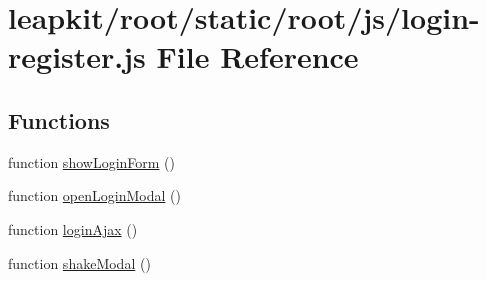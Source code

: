 \hypertarget{root_2static_2root_2js_2login-register_8js}{\section{leapkit/root/static/root/js/login-\/register.js File Reference}
\label{root_2static_2root_2js_2login-register_8js}
}
\subsection*{Functions}
\begin{DoxyCompactItemize}
\item 
function \hyperlink{root_2static_2root_2js_2login-register_8js_a7a1e1be931867b99f07d70b910a148e1}{show\-Login\-Form} ()
\item 
function \hyperlink{root_2static_2root_2js_2login-register_8js_adffc6a2438c18750d0115917a26c3ffe}{open\-Login\-Modal} ()
\item 
function \hyperlink{root_2static_2root_2js_2login-register_8js_a3b73b2b5f09f8646efc769a3c149b300}{login\-Ajax} ()
\item 
function \hyperlink{root_2static_2root_2js_2login-register_8js_a86ffdc2d61bae56a84dd274ae5fbca07}{shake\-Modal} ()
\end{DoxyCompactItemize}


